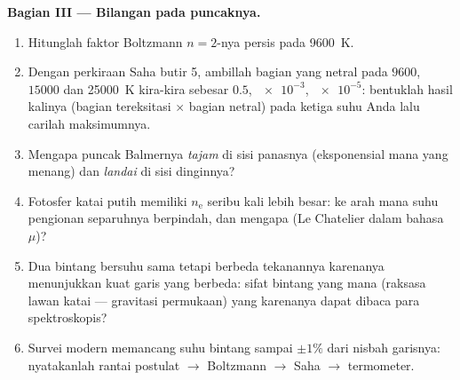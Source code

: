 \begin{problem}
\medskip\noindent\textbf{Bagian III --- Bilangan pada puncaknya.}
\begin{enumerate}[resume]
  \item Hitunglah faktor Boltzmann $n = 2$-nya persis pada
        \qty{9600}{K}.
  \item Dengan perkiraan Saha butir 5, ambillah bagian yang netral pada
        $9600$, $15000$ dan \qty{25000}{K} kira-kira sebesar
        $0.5$, $\num{e-3}$, $\num{e-5}$: bentuklah hasil kalinya
        (bagian tereksitasi $\times$ bagian netral) pada ketiga suhu
        Anda lalu carilah maksimumnya.
  \item Mengapa puncak Balmernya \emph{tajam} di sisi panasnya
        (eksponensial mana yang menang) dan \emph{landai} di sisi
        dinginnya?
  \item Fotosfer katai putih memiliki $n_{\text{e}}$ seribu kali lebih
        besar: ke arah mana suhu pengionan separuhnya berpindah, dan
        mengapa (Le Chatelier dalam bahasa $\mu$)?
  \item Dua bintang bersuhu sama tetapi berbeda tekanannya karenanya
        menunjukkan kuat garis yang berbeda: sifat bintang yang mana
        (raksasa lawan katai --- gravitasi permukaan) yang karenanya
        dapat dibaca para spektroskopis?
  \item Survei modern memancang suhu bintang sampai $\pm1\%$ dari
        nisbah garisnya: nyatakanlah rantai postulat $\to$ Boltzmann
        $\to$ Saha $\to$ termometer.
\end{enumerate}


\end{problem}
